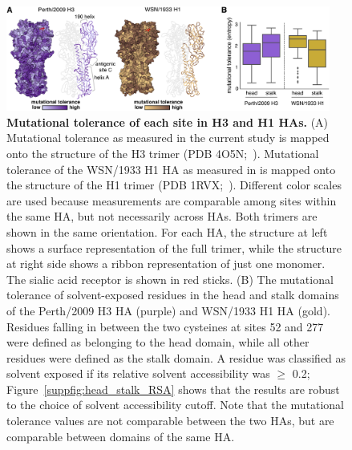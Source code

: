 \documentclass[9pt,twocolumn,twoside]{pnas-new-for-biorxiv}
\begin{document}
\begin{figure}[ht]
\centering
\includegraphics[width=0.95\textwidth]{figs/mut_tolerance/mut_tolerance_new.pdf}
\caption{\label{fig:mut_tolerance}
{\bf Mutational tolerance of each site in H3 and H1 HAs.}
(A) Mutational tolerance as measured in the current study is mapped onto the structure of the H3 trimer (PDB 4O5N;~\cite{lee2014receptor}).
Mutational tolerance of the WSN/1933 H1 HA as measured in \cite{doud2016accurate} is mapped onto the structure of the H1 trimer (PDB 1RVX;~\cite{gamblin2004structure}).
Different color scales are used because measurements are comparable among sites within the same HA, but not necessarily across HAs.
Both trimers are shown in the same orientation.
For each HA, the structure at left shows a surface representation of the full trimer, while the structure at right side shows a ribbon representation of just one monomer.
The sialic acid receptor is shown in red sticks.
(B) The mutational tolerance of solvent-exposed residues in the head and stalk domains of the Perth/2009 H3 HA (purple) and WSN/1933 H1 HA (gold).
Residues falling in between the two cysteines at sites 52 and 277 were defined as belonging to the head domain, while all other residues were defined as the stalk domain.
A residue was classified as solvent exposed if its relative solvent accessibility was $\geq$ 0.2; Figure~\ref{suppfig:head_stalk_RSA} shows that the results are robust to the choice of solvent accessibility cutoff.
Note that the mutational tolerance values are not comparable between the two HAs, but are comparable between domains of the same HA.
}
\end{figure}
\end{document}
